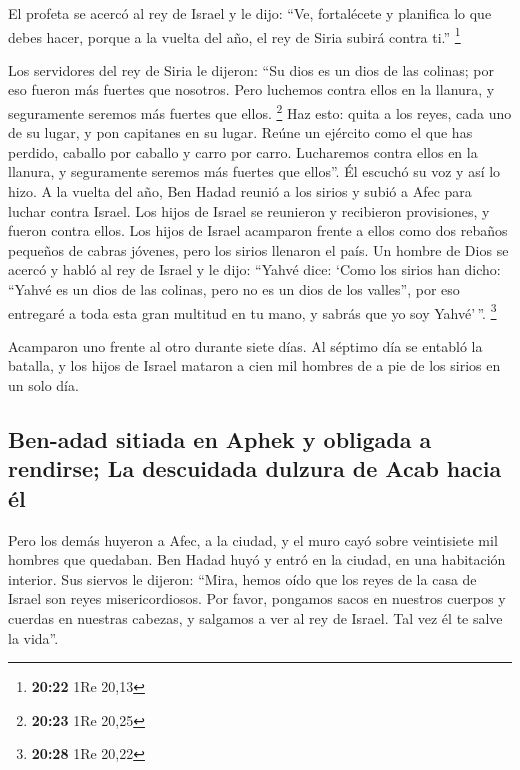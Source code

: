  El profeta se acercó al rey de Israel y le dijo: ``Ve,
fortalécete y planifica lo que debes hacer, porque a la vuelta del año,
el rey de Siria subirá contra ti.'' \footnote{\textbf{20:22} 1Re 20,13}

 Los servidores del rey de Siria le dijeron: ``Su dios es
un dios de las colinas; por eso fueron más fuertes que nosotros. Pero
luchemos contra ellos en la llanura, y seguramente seremos más fuertes
que ellos. \footnote{\textbf{20:23} 1Re 20,25}  Haz esto:
quita a los reyes, cada uno de su lugar, y pon capitanes en su lugar.
 Reúne un ejército como el que has perdido, caballo por
caballo y carro por carro. Lucharemos contra ellos en la llanura, y
seguramente seremos más fuertes que ellos''. Él escuchó su voz y así lo
hizo.  A la vuelta del año, Ben Hadad reunió a los sirios
y subió a Afec para luchar contra Israel.  Los hijos de
Israel se reunieron y recibieron provisiones, y fueron contra ellos. Los
hijos de Israel acamparon frente a ellos como dos rebaños pequeños de
cabras jóvenes, pero los sirios llenaron el país.  Un
hombre de Dios se acercó y habló al rey de Israel y le dijo: ``Yahvé
dice: `Como los sirios han dicho: ``Yahvé es un dios de las colinas,
pero no es un dios de los valles'', por eso entregaré a toda esta gran
multitud en tu mano, y sabrás que yo soy Yahvé'\,''. \footnote{\textbf{20:28}
  1Re 20,22}

 Acamparon uno frente al otro durante siete días. Al
séptimo día se entabló la batalla, y los hijos de Israel mataron a cien
mil hombres de a pie de los sirios en un solo día.

\hypertarget{ben-adad-sitiada-en-aphek-y-obligada-a-rendirse-la-descuidada-dulzura-de-acab-hacia-uxe9l}{%
\subsection{Ben-adad sitiada en Aphek y obligada a rendirse; La
descuidada dulzura de Acab hacia
él}\label{ben-adad-sitiada-en-aphek-y-obligada-a-rendirse-la-descuidada-dulzura-de-acab-hacia-uxe9l}}

 Pero los demás huyeron a Afec, a la ciudad, y el muro
cayó sobre veintisiete mil hombres que quedaban. Ben Hadad huyó y entró
en la ciudad, en una habitación interior.  Sus siervos le
dijeron: ``Mira, hemos oído que los reyes de la casa de Israel son reyes
misericordiosos. Por favor, pongamos sacos en nuestros cuerpos y cuerdas
en nuestras cabezas, y salgamos a ver al rey de Israel. Tal vez él te
salve la vida''.

